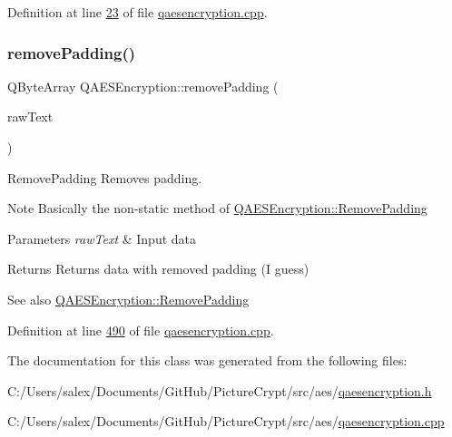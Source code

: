 Definition at line \mbox{\hyperlink{qaesencryption_8cpp_source_l00023}{23}} of file \mbox{\hyperlink{qaesencryption_8cpp_source}{qaesencryption.\+cpp}}.

\mbox{\label{class_q_a_e_s_encryption_a4dc7e77485e5a3e63eebc99b9386c17b}} 
\subsubsection{\texorpdfstring{remove\+Padding()}{removePadding()}}
{\footnotesize\ttfamily Q\+Byte\+Array Q\+A\+E\+S\+Encryption\+::remove\+Padding (\begin{DoxyParamCaption}\item[{const Q\+Byte\+Array \&}]{raw\+Text }\end{DoxyParamCaption})}



Remove\+Padding Removes padding. 

\begin{DoxyNote}{Note}
Basically the non-\/static method of \mbox{\hyperlink{class_q_a_e_s_encryption_abb2887bf5623a74053dd19627f3d3055}{Q\+A\+E\+S\+Encryption\+::\+Remove\+Padding}}
\end{DoxyNote}

\begin{DoxyParams}{Parameters}
{\em raw\+Text} & Input data \\
\hline
\end{DoxyParams}
\begin{DoxyReturn}{Returns}
Returns data with removed padding (I guess) 
\end{DoxyReturn}
\begin{DoxySeeAlso}{See also}
\mbox{\hyperlink{class_q_a_e_s_encryption_abb2887bf5623a74053dd19627f3d3055}{Q\+A\+E\+S\+Encryption\+::\+Remove\+Padding}} 
\end{DoxySeeAlso}


Definition at line \mbox{\hyperlink{qaesencryption_8cpp_source_l00490}{490}} of file \mbox{\hyperlink{qaesencryption_8cpp_source}{qaesencryption.\+cpp}}.



The documentation for this class was generated from the following files\+:\begin{DoxyCompactItemize}
\item 
C\+:/\+Users/salex/\+Documents/\+Git\+Hub/\+Picture\+Crypt/src/aes/\mbox{\hyperlink{qaesencryption_8h}{qaesencryption.\+h}}\item 
C\+:/\+Users/salex/\+Documents/\+Git\+Hub/\+Picture\+Crypt/src/aes/\mbox{\hyperlink{qaesencryption_8cpp}{qaesencryption.\+cpp}}\end{DoxyCompactItemize}
